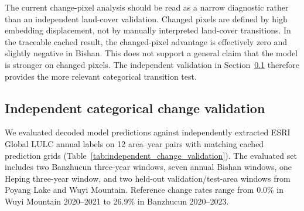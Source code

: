 \documentclass{article}
\begin{document}
The current change-pixel analysis should be read as a narrow diagnostic rather than an independent land-cover validation. Changed pixels are defined by high embedding displacement, not by manually interpreted land-cover transitions. In the traceable cached result, the changed-pixel advantage is effectively zero and slightly negative in Bishan. This does not support a general claim that the model is stronger on changed pixels. The independent validation in Section~\ref{sec:independent_change_validation} therefore provides the more relevant categorical transition test.

\subsection{Independent categorical change validation}
\label{sec:independent_change_validation}

We evaluated decoded model predictions against independently extracted ESRI Global LULC annual labels on 12 area--year pairs with matching cached prediction grids (Table~\ref{tab:independent_change_validation}). The evaluated set includes two Banzhucun three-year windows, seven annual Bishan windows, one Heping three-year window, and two held-out validation/test-area windows from Poyang Lake and Wuyi Mountain. Reference change rates range from 0.0\% in Wuyi Mountain 2020--2021 to 26.9\% in Banzhucun 2020--2023.
\end{document}
